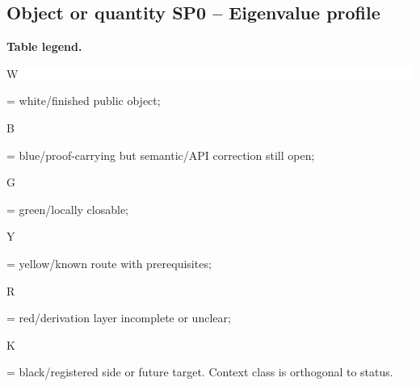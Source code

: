 \subsection*{Object or quantity SP0 -- Eigenvalue profile}
\hypertarget{objproof:SP0}{}
\par\smallskip\noindent\begin{minipage}{0.99\linewidth}\footnotesize\raggedright\textbf{Table legend.} \colorbox{white}{\strut W} = white/finished public object; \colorbox{cyan!20}{\strut B} = blue/proof-carrying but semantic/API correction still open; \colorbox{green!18}{\strut G} = green/locally closable; \colorbox{yellow!25}{\strut Y} = yellow/known route with prerequisites; \colorbox{red!20}{\strut R} = red/derivation layer incomplete or unclear; \colorbox{black!18}{\strut K} = black/registered side or future target. Context class is orthogonal to status.\end{minipage}\par\vspace{0.25em}
